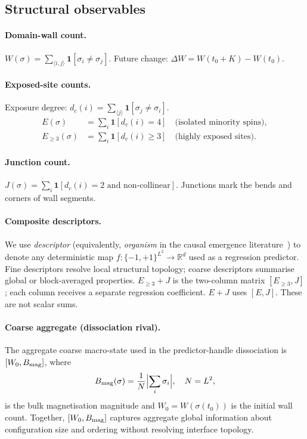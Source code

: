 \documentclass[aps,pre,preprint,superscriptaddress,showpacs]{revtex4-2}
\begin{document}
\subsection{Structural observables}

\paragraph{Domain-wall count.}
$W(\sigma) = \sum_{\langle i,j\rangle}\mathbf{1}[\sigma_i \neq \sigma_j]$.
Future change: $\Delta W = W(t_0+K) - W(t_0)$.

\paragraph{Exposed-site counts.}
Exposure degree: $d_c(i) = \sum_{\langle j\rangle}\mathbf{1}[\sigma_j\neq\sigma_i]$.
\begin{align}
E(\sigma) &= \sum_i \mathbf{1}[d_c(i) = 4] \quad \text{(isolated minority spins)},\\
E_{\geq 3}(\sigma) &= \sum_i \mathbf{1}[d_c(i) \geq 3] \quad
\text{(highly exposed sites)}.
\end{align}

\paragraph{Junction count.}
$J(\sigma) = \sum_i \mathbf{1}[\text{$d_c(i)=2$ and non-collinear}]$.
Junctions mark the bends and corners of wall segments.

\paragraph{Composite descriptors.}
We use \emph{descriptor} (equivalently, \emph{organism} in the causal
emergence literature~\cite{hoel2013}) to denote any deterministic map
$f:\{-1,+1\}^{L^2}\to\mathbb{R}^d$ used as a regression predictor.
Fine descriptors resolve local structural topology; coarse descriptors
summarise global or block-averaged properties.
$E_{\geq 3}+J$ is the two-column matrix $[E_{\geq 3}, J]$; each column
receives a separate regression coefficient.
$E+J$ uses $[E, J]$.
These are not scalar sums.

\paragraph{Coarse aggregate (dissociation rival).}
The aggregate coarse macro-state used in the predictor-handle
dissociation is $[W_0, B_{\rm mag}]$, where
\begin{equation}
B_{\rm mag}(\sigma) = \frac{1}{N}\Bigl|\sum_i \sigma_i\Bigr|, \quad N=L^2,
\end{equation}
is the bulk magnetisation magnitude and $W_0=W(\sigma(t_0))$ is the
initial wall count.
Together, $[W_0,B_{\rm mag}]$ captures aggregate global information
about configuration size and ordering without resolving interface topology.
\end{document}
